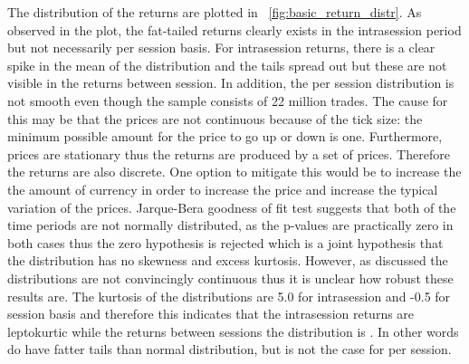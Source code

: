 The distribution of the returns are plotted in ~\ref{fig:basic_return_distr}. As observed in the plot, the fat-tailed returns
clearly exists in the intrasession period but not necessarily per session basis. For intrasession returns, there is a clear spike in the mean of the 
distribution and the tails spread out but these are not visible in the returns between session. In addition, the per session distribution
is not smooth even though the sample consists of 22 million trades. The cause for this may be that the prices are not 
continuous because of the tick size: the minimum possible amount for the price to go up or down is one. Furthermore, prices are
stationary thus the returns are produced by a set of prices. Therefore the returns are also discrete. One option
to mitigate this would be to increase the the amount of currency in order to increase the price and increase the typical
variation of the prices. Jarque-Bera goodness of fit test suggests that both of the time periods are not normally distributed,
as the p-values are practically zero in both cases thus the zero hypothesis is rejected which is a joint hypothesis that the
distribution has no skewness and excess kurtosis. However, as discussed the distributions are not convincingly continuous thus
it is unclear how robust these results are. The kurtosis of the distributions are 5.0 for intrasession and -0.5 for session basis
and therefore this indicates that the intrasession returns are leptokurtic while the returns between sessions the distribution is
. In other words do have fatter tails than normal distribution, 
but is not the case for per session.




